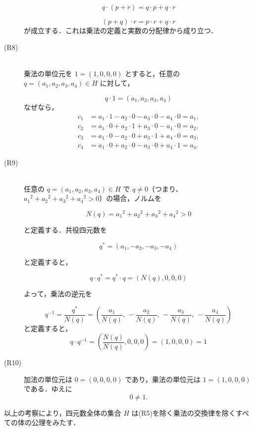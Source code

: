 \begin{tproof}
\begin{description}
              \[
                  q \cdot (p + r) = q \cdot p + q \cdot r
              \]

              \[
                  (p + q) \cdot r = p \cdot r + q \cdot r
              \]
              が成立する．これは乗法の定義と実数の分配律から成り立つ．
        \item [(R8)] \mbox{} \\
              乗法の単位元を $1 = (1, 0, 0, 0)$ とすると，任意の $q = (a_1, a_2, a_3, a_4) \in H$ に対して，

              \[
                  q \cdot 1 = (a_1, a_2, a_3, a_4)
              \]
              なぜなら，
              \begin{align*}
                  c_1 & = a_1 \cdot 1 - a_2 \cdot 0 - a_3 \cdot 0 - a_4 \cdot 0 = a_1, \\
                  c_2 & = a_1 \cdot 0 + a_2 \cdot 1 + a_3 \cdot 0 - a_4 \cdot 0 = a_2, \\
                  c_3 & = a_1 \cdot 0 - a_2 \cdot 0 + a_3 \cdot 1 + a_4 \cdot 0 = a_3, \\
                  c_4 & = a_1 \cdot 0 + a_2 \cdot 0 - a_3 \cdot 0 + a_4 \cdot 1 = a_4.
              \end{align*}
        \item [(R9)] \mbox{} \\
              任意の $q = (a_1, a_2, a_3, a_4) \in H$ で $q \ne 0$（つまり、${a_1}^2 + {a_2}^2 + {a_3}^2 + {a_4}^2 > 0$）の場合，ノルムを

              \[
                  N(q) = {a_1}^2 + {a_2}^2 + {a_3}^2 + {a_4}^2 > 0
              \]

              と定義する．共役四元数を

              \[
                  q^* = (a_1, -a_2, -a_3, -a_4)
              \]

              と定義すると，

              \[
                  q \cdot q^* = q^* \cdot q = (N(q), 0, 0, 0)
              \]

              よって，乗法の逆元を

              \[
                  q^{-1} = \frac{q^*}{N(q)} = \left( \frac{a_1}{N(q)},\, -\frac{a_2}{N(q)},\, -\frac{a_3}{N(q)},\, -\frac{a_4}{N(q)} \right)
              \]
              と定義すると，
              \[
                  q \cdot q^{-1} = \left( \frac{N(q)}{N(q)}, 0, 0, 0 \right) = (1, 0, 0, 0) = 1
              \]
        \item [(R10)]
              加法の単位元は $0 = (0, 0, 0, 0)$ であり，乗法の単位元は $1 = (1, 0, 0, 0)$ である．ゆえに
              \[
                  0 \ne 1.
              \]
    \end{description}
    以上の考察により，四元数全体の集合 $H$ は(R5)を除く乗法の交換律を除くすべての体の公理をみたす．
\end{tproof}


